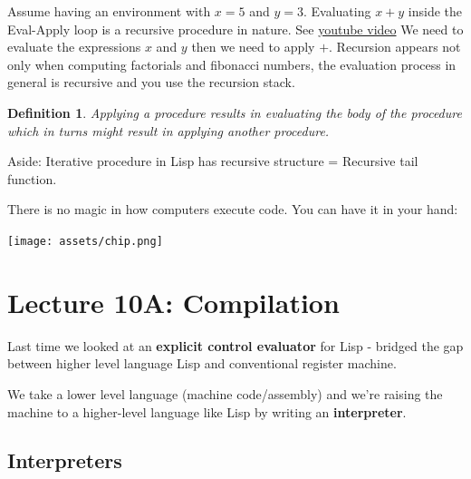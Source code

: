 \documentclass[a4paper,twoside]{article}
\newtheorem{definition}[theorem]{Definition}
\numberwithin{equation}{section}
\begin{document}
Assume having an environment with $x=5$ and $y=3$. Evaluating $x+y$  inside the Eval-Apply loop is a
recursive procedure in nature. See \href{https://youtu.be/Z8-qWEEwTCk?list=PLE18841CABEA24090&t=1281}{youtube video}
We need to evaluate the expressions $x$ and $y$ then we need to apply $+$. Recursion appears not only
when computing factorials and fibonacci numbers, the evaluation process in general is recursive and you
use the recursion stack.\newline
\begin{definition}
Applying a procedure results in evaluating the body of the procedure which in turns might result in
applying another procedure.
\end{definition}
\begin{center}
    Aside: Iterative procedure in Lisp has recursive structure = Recursive tail function.
\end{center}

There is no magic in how computers execute code. You can have it in your hand:
\begin{center}
    \texttt{[image: assets/chip.png]}
\end{center}

\section{Lecture 10A: Compilation}
Last time we looked at an \textbf{explicit control evaluator} for Lisp - bridged the gap between
higher level language Lisp and conventional register machine.

We take a lower level language (machine code/assembly) and we're raising the machine to a higher-level
language like Lisp by writing an \textbf{interpreter}.

\subsection{Interpreters}
\end{document}

